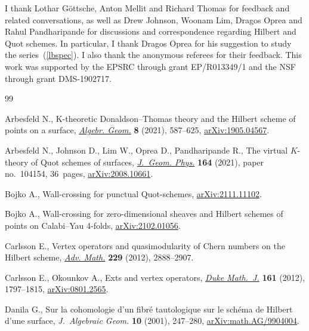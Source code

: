 \documentclass[10pt,a4paper]{amsart}
\numberwithin{equation}{section}
\begin{document}
I thank Lothar G\"{o}ttsche, Anton Mellit and Richard Thomas for feedback and related conversations, as well as Drew Johnson, Woonam Lim, Dragos Oprea and Rahul Pandharipande for discussions and correspondence regarding Hilbert and Quot schemes. In particular, I thank Dragos Oprea for his suggestion to study the series~(\ref{lbspec}). I also thank the anonymous referees for their feedback. This work was supported by the EPSRC through grant EP/R013349/1 and the NSF through grant DMS-1902717.

%
%


\begin{thebibliography}{99}
\footnotesize\itemsep=0pt

Arbesfeld N., K-theoretic {D}onaldson--{T}homas theory and the {H}ilbert scheme
 of points on a surface, \href{https://doi.org/10.14231/ag-2021-018}{\textit{Algebr. Geom.}} \textbf{8} (2021), 587--625,
 \href{https://arxiv.org/abs/1905.04567}{arXiv:1905.04567}.

Arbesfeld N., Johnson D., Lim W., Oprea D., Pandharipande R., The virtual
 {$K$}-theory of {Q}uot schemes of surfaces, \href{https://doi.org/10.1016/j.geomphys.2021.104154}{\textit{J.~Geom. Phys.}}
 \textbf{164} (2021), paper no.~104154, 36~pages, \href{https://arxiv.org/abs/2008.10661}{arXiv:2008.10661}.

Bojko A., Wall-crossing for punctual {Q}uot-schemes, \href{https://arxiv.org/abs/2111.11102}{arXiv:2111.11102}.

Bojko A., Wall-crossing for zero-dimensional sheaves and {H}ilbert schemes of
 points on {C}alabi--{Y}au 4-folds, \href{https://arxiv.org/abs/2102.01056}{arXiv:2102.01056}.

Carlsson E., Vertex operators and quasimodularity of {C}hern numbers on the
 {H}ilbert scheme, \href{https://doi.org/10.1016/j.aim.2011.10.003}{\textit{Adv. Math.}} \textbf{229} (2012), 2888--2907.

Carlsson E., Okounkov A., Exts and vertex operators, \href{https://doi.org/10.1215/00127094-1593380}{\textit{Duke Math.~J.}}
 \textbf{161} (2012), 1797--1815, \href{https://arxiv.org/abs/0801.2565}{arXiv:0801.2565}.

Danila G., Sur la cohomologie d'un fibr\'e tautologique sur le sch\'ema de
 {H}ilbert d'une surface, \textit{J.~Algebraic Geom.} \textbf{10} (2001),
 247--280, \href{https://arxiv.org/abs/math.AG/9904004}{arXiv:math.AG/9904004}.


\end{thebibliography}
\end{document}
